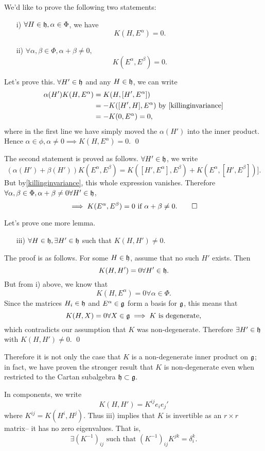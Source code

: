 We'd like to prove the following two statements:
\begin{enumerate}
    \item[i)] $\forall H\in \mathfrak{h},\alpha\in \Phi$, we have
    $$K(H,E^\alpha)=0.$$
    \item[ii)] $\forall \alpha,\beta\in \Phi, \alpha+\beta \neq 0,$
    $$K(E^\alpha,E^\beta)=0.$$
\end{enumerate}

Let's prove this. $\forall H'\in \mathfrak{h}$ and any $H\in \mathfrak{h}$, we can write
\begin{align*}
\alpha(H')K(H,E^\alpha)&= K(H,[H',E^\alpha])\\
&=-K([H',H],E^\alpha)\text{ by \ref{killinginvariance}}\\
&=-K(0,E^\alpha)=0,
\end{align*}
where in the first line we have simply moved the $\alpha(H')$ into the inner product. Hence $\alpha \in \phi, \alpha\neq 0 \implies K(H,E^\alpha)=0.$ \qed

The second statement is proved as follows. $\forall H'\in \mathfrak{h}$, we write
$$(\alpha(H')+\beta(H'))K(E^\alpha,E^\beta)=K([H',E^\alpha],E^\beta)+K(E^\alpha,[H',E^\beta])].$$
But by\ref{killinginvariance}, this whole expression vanishes. Therefore
$\forall\alpha,\beta\in \Phi, \alpha+\beta \neq 0 \forall H'\in \mathfrak{h}$,
$$\implies K(E^\alpha,E^\beta)=0 \text{ if } \alpha+\beta \neq 0. \qed$$

Let's prove one more lemma. 
\begin{itemize}
    \item[iii)] $\forall H\in \mathfrak{h}, \exists H'\in \mathfrak{h}$ such that $K(H,H')\neq 0.$
\end{itemize}
The proof is as follows. For some $H\in \mathfrak{h}$, assume that no such $H'$ exists. Then $$K(H,H')=0\forall H'\in \mathfrak{h}.$$ But from i) above, we know that
$$K(H,E^\alpha)=0\forall \alpha \in \Phi.$$
Since the matrices $H_i\in \mathfrak{h}$ and $E^\alpha\in \mathfrak{g}$ form a basis for $\mathfrak{g}$, this means that $$K(H,X)=0\forall X \in \mathfrak{g} \implies K \text{ is degenerate}, $$
which contradicts our assumption that $K$ was non-degenerate. Therefore $\exists H'\in \mathfrak{h}$ with $K(H,H')\neq 0$. \qed

Therefore it is not only the case that $K$ is a non-degenerate inner product on $\mathfrak{g}$; in fact, we have proven the stronger result that $K$ is non-degenerate even when restricted to the Cartan subalgebra $\mathfrak{h}\subset \mathfrak{g}$.

In components, we write
$$K(H,H')=K^{ij}e_i e_j'$$ where $K^{ij}=K(H^i,H^j)$. Thus iii) implies that $K$ is invertible as an $r\times r$ matrix-- it has no zero eigenvalues. That is,
$$\exists(K^{-1})_{ij}\text{ such that }(K^{-1})_{ij} K^{jk}=\delta_i^k.$$

